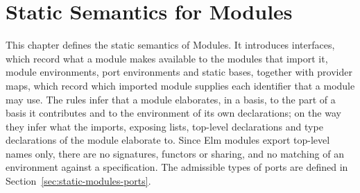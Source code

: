 
\chapter{Static Semantics for Modules}\label{ch:static-modules}

This chapter defines the static semantics of Modules. %
It introduces interfaces, which record what a module makes available to the
modules that import it, module environments, port environments and static
bases, together with provider maps, which record which imported module
supplies each identifier that a module may use. The rules infer that a module
elaborates, in a basis, to the part of a basis it contributes and to the
environment of its own declarations; on the way they infer what the imports,
exposing lists, top-level declarations and type declarations of the module
elaborate to. Since Elm modules export top-level names only, there are no
signatures, functors or sharing, and no matching of an environment against a
specification. The admissible types of ports are defined in
Section~\ref{sec:static-modules-ports}. %

